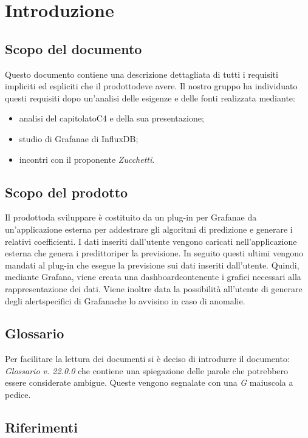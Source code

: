 \section{Introduzione}
	\subsection{Scopo del documento}
	Questo documento contiene una descrizione dettagliata di tutti i requisiti impliciti ed espliciti che il prodotto\glosp deve avere. Il nostro gruppo ha individuato questi requisiti dopo un'analisi delle esigenze e delle fonti realizzata mediante: 
	\begin{itemize}
		\item analisi del capitolato\glosp C4 e della sua presentazione; 
		\item studio di Grafana\glosp e di InfluxDB;
		\item incontri con il proponente \textit{Zucchetti}.
	\end{itemize}
	\subsection{Scopo del prodotto}
	Il prodotto\glosp da sviluppare è costituito da un plug-in per Grafana\glosp e da un'applicazione esterna per addestrare gli algoritmi di predizione e generare i relativi coefficienti. I dati inseriti dall'utente vengono caricati nell'applicazione esterna che genera i predittori\glosp per la previsione. In seguito questi ultimi vengono mandati al plug-in che esegue la previsione sui dati inseriti dall'utente. Quindi, mediante Grafana\glo, viene creata una dashboard\glosp contenente i grafici necessari alla rappresentazione dei dati. Viene inoltre data la possibilità all'utente di generare degli alert\glosp specifici di Grafana\glosp che lo avvisino in caso di anomalie.
		
	\subsection{Glossario}
	Per facilitare la lettura dei documenti si è deciso di introdurre il documento: \textit{Glossario v. 22.0.0} che contiene una spiegazione delle parole che potrebbero essere considerate ambigue. Queste vengono segnalate con una \textit{G} maiuscola a pedice.  
	\subsection{Riferimenti}

